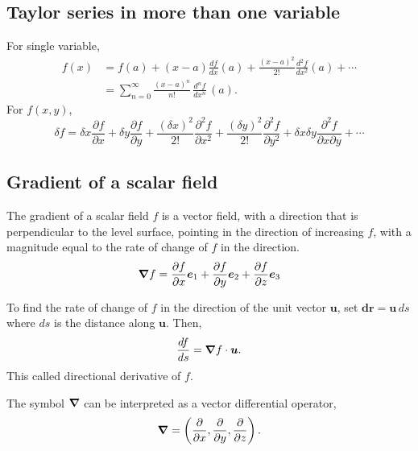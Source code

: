 \subsection{Taylor series in more than one variable}
For single variable,
\begin{equation}
\begin{aligned}
    f(x) 
    &= f(a)+(x-a) \frac{d f}{d x}(a)+\frac{(x-a)^{2}}{2 !} \frac{d^{2} f}{d x^{2}}(a)+\cdots \\
    &= \sum^\infty_{n=0} \frac{(x-a)^n}{n!} \, \frac{d^n f}{dx^n}\,(a).
\end{aligned}
\end{equation}
For $f(x,y)$, 
\begin{equation}
    \delta f
    =\delta x \frac{\partial f}{\partial x}
    +\delta y \frac{\partial f}{\partial y}
    +\frac{(\delta x)^{2}}{2 !} \frac{\partial^{2} f}{\partial x^{2}}
    +\frac{(\delta y)^{2}}{2 !} \frac{\partial^{2} f}{\partial y^{2}}
    +\delta x \delta y \frac{\partial^{2} f}{\partial x \partial y}
    +\cdots
\end{equation}

\subsection{Gradient of a scalar field}
The gradient of a scalar field $f$ is a vector field, with a direction that is perpendicular to the level surface, pointing in the direction of increasing $f$, with a magnitude equal to the rate of change of $f$ in the direction. 
\begin{equation}
    \bm{\nabla} f=\frac{\partial f}{\partial x} \bm{e}_{1}+\frac{\partial f}{\partial y} \bm{e}_{2}+\frac{\partial f}{\partial z} \bm{e}_{3}
\end{equation}

To find the rate of change of $f$ in the direction of the unit vector $\bm{u}$, set $\bm{dr} = \bm{u} \,ds$ where $ds$ is the distance along $\bm{u}$. 
Then, 
\begin{equation}
    \frac{d f}{d s}=\bm{\nabla} f \cdot \bm{u}.
\end{equation}
This called directional derivative of $f$.

The symbol $\bm{\nabla}$ can be interpreted as a vector differential operator, 
\begin{equation}
    \bm{\nabla}=\left(\frac{\partial}{\partial x}, \frac{\partial}{\partial y}, \frac{\partial}{\partial z}\right).
\end{equation}

